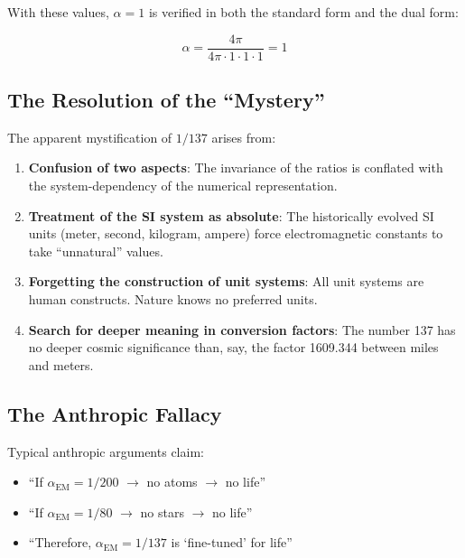 With these values, $\alpha = 1$ is verified in both the standard form and the dual form:

\begin{equation}
	\alpha = \frac{4\pi}{4\pi \cdot 1 \cdot 1 \cdot 1} = 1
\end{equation}

\subsection{The Resolution of the ``Mystery''}
\label{subsec:mystery_resolution}

The apparent mystification of $1/137$ arises from:

\begin{enumerate}
	\item \textbf{Confusion of two aspects}: The invariance of the ratios is conflated with the system-dependency of the numerical representation.
	
	\item \textbf{Treatment of the SI system as absolute}: The historically evolved SI units (meter, second, kilogram, ampere) force electromagnetic constants to take ``unnatural'' values.
	
	\item \textbf{Forgetting the construction of unit systems}: All unit systems are human constructs. Nature knows no preferred units.
	
	\item \textbf{Search for deeper meaning in conversion factors}: The number 137 has no deeper cosmic significance than, say, the factor 1609.344 between miles and meters.
\end{enumerate}

\subsection{The Anthropic Fallacy}
\label{subsec:anthropic_fallacy}

Typical anthropic arguments claim:
\begin{itemize}
	\item ``If $\alpha_{\text{EM}} = 1/200$ $\rightarrow$ no atoms $\rightarrow$ no life''
	\item ``If $\alpha_{\text{EM}} = 1/80$ $\rightarrow$ no stars $\rightarrow$ no life''
	\item ``Therefore, $\alpha_{\text{EM}} = 1/137$ is `fine-tuned' for life''
\end{itemize}

